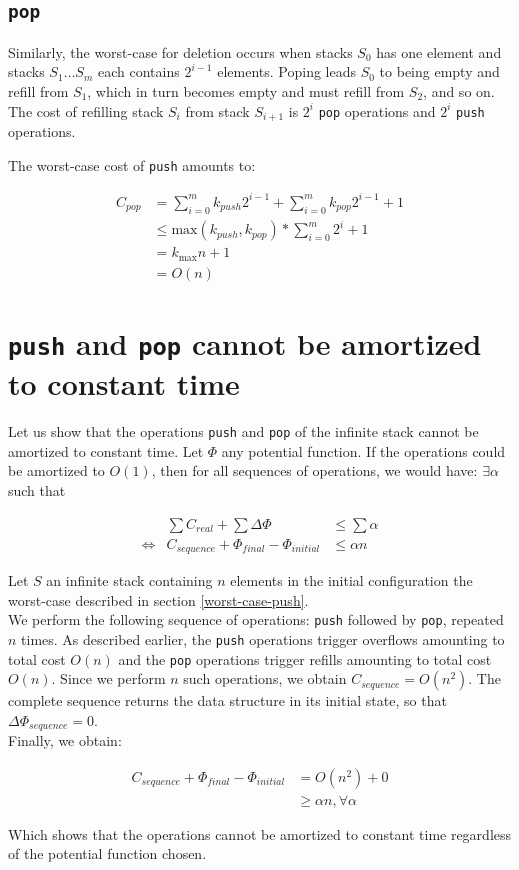  \subsection{\texttt{pop}}
  Similarly, the worst-case for deletion occurs when stacks $S_0$ has one element and stacks $S_1\ldots S_m$ each contains $2^{i-1}$ elements. Poping leads $S_0$ to being empty and refill from $S_1$, which in turn becomes empty and must refill from $S_2$, and so on. The cost of refilling stack $S_i$ from stack $S_{i+1}$ is $2^i$ \texttt{pop} operations and $2^i$ \texttt{push} operations.

  The worst-case cost of \texttt{push} amounts to:

  \[
  \begin{array}{ll}
    C_{pop} & = \sum_{i=0}^m k_{push} 2^{i-1} + \sum_{i=0}^m k_{pop} 2^{i-1} + 1\\
            & \leq \text{max}(k_{push}, k_{pop}) * \sum_{i=0}^m 2^i + 1\\
            & = k_{\text{max}} n + 1\\
            & = O(n)
  \end{array}
  \]

\section{\texttt{push} and \texttt{pop} cannot be amortized to constant time}

Let us show that the operations \texttt{push} and \texttt{pop} of the infinite stack cannot be amortized to constant time. Let $\Phi$ any potential function. If the operations could be amortized to $O(1)$, then for all sequences of operations, we would have: $\exists \alpha$ such that

\[
\begin{array}{lrcl}
  & \sum C_{real} + \sum \Delta\Phi & \leq \sum \alpha \\
  \iff & C_{sequence} + \Phi_{final} - \Phi_{initial} & \leq \alpha n
\end{array}
\]

Let $S$ an infinite stack containing $n$ elements in the initial configuration the worst-case described in section \ref{worst-case-push}.\\
We perform the following sequence of operations: \texttt{push} followed by \texttt{pop}, repeated $n$ times. As described earlier, the \texttt{push} operations trigger overflows amounting to total cost $O(n)$ and the \texttt{pop} operations trigger refills amounting to total cost $O(n)$. Since we perform $n$ such operations, we obtain $C_{sequence} = O(n^2)$. The complete sequence returns the data structure in its initial state, so that $\Delta\Phi_{sequence} = 0$.\\
Finally, we obtain:

\[
\begin{array}{rl}
  C_{sequence} + \Phi_{final} - \Phi_{initial} & = O(n^2) + 0 \\
   & \geq \alpha n, \forall \alpha
\end{array}
\]

Which shows that the operations cannot be amortized to constant time regardless of the potential function chosen.
